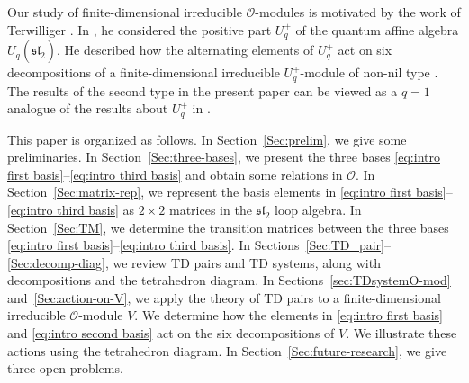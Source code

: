 \documentclass[11pt]{article}%
\theoremstyle{definition}
\theoremstyle{plain}
\begin{document}
\smallskip
Our study of finite-dimensional irreducible $\mathcal{O}$-modules is motivated by the work of Terwilliger \cite{2023TerJCTA}.
In \cite[Sections~8,9]{2023TerJCTA}, he considered the positive part $U_q^+$ of the quantum affine algebra $U_q(\widehat{\mathfrak{sl}}_2)$.
He described how the alternating elements of $U_q^+$ act on six decompositions of a finite-dimensional irreducible $U_q^+$-module of non-nil type \cite{IT2007JAA}.
The results of the second type in the present paper can be viewed as a $q=1$ analogue of the results about $U_q^+$ in \cite{2023TerJCTA}.


\smallskip
This paper is organized as follows.
In Section~\ref{Sec:prelim}, we give some preliminaries.
In Section~\ref{Sec:three-bases}, we present the three bases \eqref{eq:intro first basis}--\eqref{eq:intro third basis} and obtain some relations in $\mathcal{O}$.
In Section~\ref{Sec:matrix-rep}, we represent the basis elements in \eqref{eq:intro first basis}--\eqref{eq:intro third basis} as $2\times 2$ matrices in the $\mathfrak{sl}_2$ loop algebra.
In Section~\ref{Sec:TM}, we determine the transition matrices between the three bases \eqref{eq:intro first basis}--\eqref{eq:intro third basis}.
In Sections~\ref{Sec:TD_pair}--\ref{Sec:decomp-diag}, we review TD pairs and TD systems, along with decompositions and the tetrahedron diagram.
In Sections~\ref{sec:TDsystemO-mod} and~\ref{Sec:action-on-V}, we apply the theory of TD pairs to a finite-dimensional irreducible $\mathcal{O}$-module $V$. 
We determine how the elements in \eqref{eq:intro first basis} and \eqref{eq:intro second basis} act on the six decompositions of $V$.
We illustrate these actions using the tetrahedron diagram.
In Section~\ref{Sec:future-research}, we give three open problems.

\end{document}
